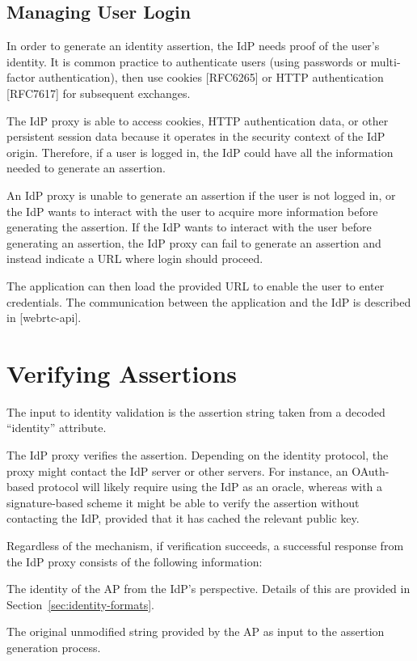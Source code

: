 \documentclass{article}
\begin{document}
\subsection{Managing User Login}

In order to generate an identity assertion, the IdP needs proof of
the user's identity.  It is common practice to authenticate users
(using passwords or multi-factor authentication), then use cookies
[RFC6265] or HTTP authentication [RFC7617] for subsequent exchanges.

The IdP proxy is able to access cookies, HTTP authentication data, or
other persistent session data because it operates in the security
context of the IdP origin.  Therefore, if a user is logged in, the
IdP could have all the information needed to generate an assertion.

An IdP proxy is unable to generate an assertion if the user is not
logged in, or the IdP wants to interact with the user to acquire more
information before generating the assertion.  If the IdP wants to
interact with the user before generating an assertion, the IdP proxy
can fail to generate an assertion and instead indicate a URL where
login should proceed.

The application can then load the provided URL to enable the user to
enter credentials.  The communication between the application and the
IdP is described in [webrtc-api].

\section{Verifying Assertions}

The input to identity validation is the assertion string taken from a
decoded ``identity'' attribute.

The IdP proxy verifies the assertion.  Depending on the identity
protocol, the proxy might contact the IdP server or other servers.
For instance, an OAuth-based protocol will likely require using the
IdP as an oracle, whereas with a signature-based scheme it might be
able to verify the assertion without contacting the IdP, provided
that it has cached the relevant public key.

Regardless of the mechanism, if verification succeeds, a successful
response from the IdP proxy consists of the following information:

\begin{description}[style=nextline]
\item[identity:] The identity of the AP from the IdP's perspective.
  Details of this are provided in Section~\ref{sec:identity-formats}.

\item[contents:] The original unmodified string provided by the AP as input
  to the assertion generation process.
\end{description}
\end{document}
